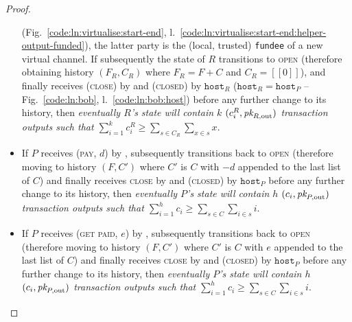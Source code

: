 \begin{proof}
\begin{itemize}
    (Fig.~\ref{code:ln:virtualise:start-end},
    l.~\ref{code:ln:virtualise:start-end:helper-output-funded}), the latter
    party is the (local, trusted) \texttt{fundee} of a new virtual channel. If
    subsequently the state of $R$ transitions to \textsc{open} (therefore
    obtaining history $(F_R, C_R)$ where $F_R = F + C$ and $C_R = [[0]]$), and
    finally receives (\textsc{close}) by \environment and (\textsc{closed}) by
    $\texttt{host}_R$ ($\texttt{host}_R = \texttt{host}_P$ --
    Fig.~\ref{code:ln:bob}, l.~\ref{code:ln:bob:host}) before any further change
    to its history, then \emph{eventually $R$'s \ledger state will contain $k$
    $(c^R_i, \textit{pk}_{R, \mathrm{out}})$ transaction outputs such that
    $\sum\limits_{i=1}^k c^R_i \geq \sum\limits_{s \in C_R} \sum\limits_{x \in
    s} x$}.
    \item If $P$ receives (\textsc{pay}, $d$) by \environment, subsequently
    transitions back to \textsc{open} (therefore moving to history $(F, C')$
    where $C'$ is $C$ with $-d$ appended to the last list of $C$) and finally
    receives \textsc{close} by \environment and (\textsc{closed}) by
    $\texttt{host}_P$ before any further change to its history, then
    \emph{eventually $P$'s \ledger state will contain $h$ $(c_i, \textit{pk}_{P,
    \mathrm{out}})$ transaction outputs such that $\sum\limits_{i=1}^h c_i \geq
    \sum\limits_{s \in C} \sum\limits_{i \in s} i$}. \item If $P$ receives
    (\textsc{get paid}, $e$) by \environment, subsequently transitions back to
    \textsc{open} (therefore moving to history $(F, C')$ where $C'$ is $C$ with
    $e$ appended to the last list of $C$) and finally receives \textsc{close} by
    \environment and (\textsc{closed}) by $\texttt{host}_P$ before any further
    change to its history, then \emph{eventually $P$'s \ledger state will
    contain $h$ $(c_i, \textit{pk}_{P, \mathrm{out}})$ transaction outputs such that
    $\sum\limits_{i=1}^h c_i \geq \sum\limits_{s \in C} \sum\limits_{i \in s}
    i$}.
  \end{itemize}
\end{proof}

